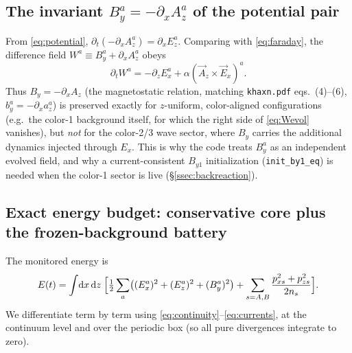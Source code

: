 \documentclass[11pt,a4paper]{article}
\numberwithin{equation}{section}
\theoremstyle{remark}
\newcommand{\dd}{\mathrm{d}}
\begin{document}
\subsection{The invariant $B_y^a=-\partial_xA_z^a$ of the potential pair}
\label{ssec:byinvariant}

From \eqref{eq:potential}, $\partial_t(-\partial_xA_z^a)=\partial_xE_z^a$.
Comparing with \eqref{eq:faraday}, the difference field
$W^a\equiv B_y^a+\partial_xA_z^a$ obeys
\begin{equation}
\partial_t W^a=-\partial_zE_x^a+\alpha(\vec A_z\times\vec E_x)^a .
\label{eq:Wevol}
\end{equation}
Thus $B_y=-\partial_xA_z$ (the magnetostatic relation, matching
\texttt{khaxn.pdf} eqs.~(4)--(6), $b_y^a=-\partial_xa_z^a$) is preserved
exactly for $z$-uniform, color-aligned configurations
(e.g.\ the color-1 background itself, for which the right side of
\eqref{eq:Wevol} vanishes), but \emph{not} for the color-2/3 wave sector,
where $B_y$ carries the additional dynamics injected through $E_x$. This is
why the code treats $B_y^a$ as an independent evolved field, and why a
current-consistent $B_{y1}$ initialization (\texttt{init\_by1\_eq}) is
needed when the color-1 sector is live (\S\ref{ssec:backreaction}).

\subsection{Exact energy budget: conservative core plus the frozen-background
battery}
\label{ssec:energy}

The monitored energy is
\begin{equation}
E(t)=\int\!\dd x\,\dd z\;\Bigl[
\tfrac12\sum_a\bigl((E_x^a)^2+(E_z^a)^2+(B_y^a)^2\bigr)
+\sum_{s=A,B}\frac{p_{xs}^2+p_{zs}^2}{2n_s}\Bigr].
\label{eq:energydef}
\end{equation}
We differentiate term by term using
\eqref{eq:continuity}--\eqref{eq:currents}, at the continuum level and over
the periodic box (so all pure divergences integrate to zero).
\end{document}
